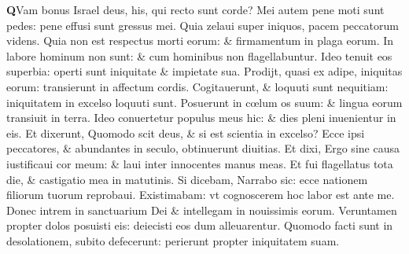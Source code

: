 \documentclass[a5paper,10pt]{book}
\def\oe{œ}
\begin{document}
\begin{multicols*}{2}
\lettrine[lines=2]{\bfseries \color{red} Q}{}Vam bonus Israel deus, his, qui recto sunt corde?
\newline \color{red} M\color{black}ei autem pene moti sunt pedes: pene effusi sunt gressus mei.
\newline \color{red} Q\color{black}uia zelaui super iniquos, pacem peccatorum videns.
\newline \color{red} Q\color{black}uia non est respectus morti eorum: \& firmamentum in plaga eorum.
\newline \color{red} I\color{black}n labore hominum non sunt: \& cum hominibus non flagellabuntur.
\newline \color{red} I\color{black}deo tenuit eos superbia: operti sunt iniquitate \& impietate sua.
\newline \color{red} P\color{black}rodijt, quasi ex adipe, iniquitas eorum: transierunt in affectum cordis.
\newline \color{red} C\color{black}ogitauerunt, \& loquuti sunt nequitiam: iniquitatem in excelso loquuti sunt.
\newline \color{red} P\color{black}osuerunt in c\oe lum os suum: \& lingua eorum transiuit in terra.
\newline \color{red} I\color{black}deo conuertetur populus meus hic: \& dies pleni inuenientur in eis.
\newline \color{red} E\color{black}t dixerunt, Quomodo scit deus, \& si est scientia in excelso?
\newline \color{red} E\color{black}cce ipsi peccatores, \& abundantes in seculo, obtinuerunt diuitias.
\newline \color{red} E\color{black}t dixi, Ergo sine causa iustificaui cor meum: \& laui inter innocentes manus meas.
\newline \color{red} E\color{black}t fui flagellatus tota die, \& castigatio mea in matutinis.
\newline \color{red} S\color{black}i dicebam, Narrabo sic: ecce nationem filiorum tuorum reprobaui.
\newline \color{red} E\color{black}xistimabam: vt cognoscerem hoc labor est ante me.
\newline \color{red} D\color{black}onec intrem in sanctuarium Dei \& intellegam in nouissimis eorum.
\newline \color{red} V\color{black}eruntamen propter dolos posuisti eis: deiecisti eos dum alleuarentur.
\newline \color{red} Q\color{black}uomodo facti sunt in desolationem, subito defecerunt: perierunt propter iniquitatem suam.

\end{multicols*}
\end{document}
